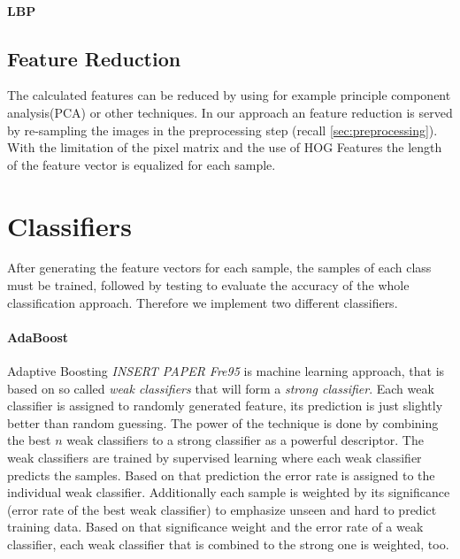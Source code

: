 \documentclass[a4paper,10pt]{article}
\begin{document}
\paragraph{LBP}


\subsection{Feature Reduction}

The calculated features can be reduced by using for example principle component analysis(PCA) or other techniques.
In our approach an feature reduction is served by re-sampling the images in the preprocessing step (recall \autoref{sec:preprocessing}).
With the limitation of the pixel matrix and the use of HOG Features the length of the feature vector is equalized for each sample.

\section{Classifiers}

After generating the feature vectors for each sample, the samples of each class must be trained, followed by testing to evaluate the accuracy of the whole classification approach. 
Therefore we implement two different classifiers. 

\paragraph{AdaBoost}
Adaptive Boosting \emph{INSERT PAPER Fre95} is machine learning approach, that is based on so called \textit{weak classifiers} that will form a \textit{strong classifier}. Each weak classifier is assigned to randomly generated feature, its prediction is just slightly better than random guessing. The power of the technique is done by combining the best $n$ weak classifiers to a strong classifier as a powerful descriptor. The weak classifiers are trained by supervised learning where each weak classifier predicts the samples. Based on that prediction the error rate is assigned to the individual weak classifier. Additionally each sample is weighted by its significance (error rate of the best weak classifier) to emphasize unseen and hard to predict training data. Based on that significance weight and the error rate of a weak classifier, each weak classifier that is combined to the strong one is weighted, too.
\end{document}
